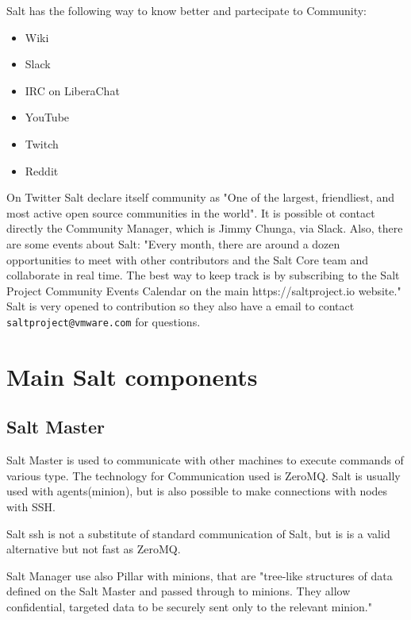 \documentclass[12pt,a4paper,openright,twoside]{book}
\begin{document}
Salt has the following way to know better and partecipate to Community:
\begin{itemize}
    \item Wiki
    \item Slack
    \item IRC on LiberaChat
    \item YouTube
    \item Twitch
    \item Reddit
\end{itemize}
On Twitter Salt declare itself community as "One of the largest, friendliest, and most active open source communities in the world"\cite{saltTwitter}.
It is possible ot contact directly the Community Manager, which is Jimmy Chunga, via Slack.
Also, there are some events about Salt:
"Every month, there are around a dozen opportunities to meet with other contributors and the Salt Core team and collaborate in real time. The best way to keep track is by subscribing to the Salt Project Community Events Calendar on the main https://saltproject.io website."\cite{saltGitHub}
Salt is very opened to contribution so they also have a email to contact \texttt{saltproject@vmware.com} for questions.

\section{Main Salt components}

\subsection{Salt Master}

Salt Master is used to communicate with other machines to execute commands of various type.
The technology for Communication used is ZeroMQ. Salt is usually used with agents(minion), but is also possible to make connections with nodes with SSH.

Salt ssh is not a substitute of standard communication of Salt, but is is a valid alternative but not fast as ZeroMQ\cite{saltSSH}.

Salt Manager use also Pillar with minions, that are "tree-like structures of data defined on the Salt Master and passed through to minions. They allow confidential, targeted data to be securely sent only to the relevant minion."\cite{saltDocPillar}
\end{document}
